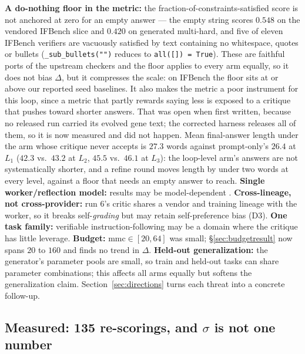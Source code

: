 \documentclass[11pt]{article}
\newcommand{\dd}{\ensuremath{\Delta}}
\begin{document}
\textbf{A do-nothing floor in the
metric:} the fraction-of-constraints-satisfied score is not anchored at zero for an empty
answer --- the empty string scores $0.548$ on the vendored IFBench slice and $0.420$ on
generated multi-hard, and five of eleven IFBench verifiers are vacuously satisfied by text
containing no whitespace, quotes or bullets (\texttt{\_sub\_bullets("")} reduces to
\texttt{all([]) = True}). These are faithful ports of the upstream checkers and the floor
applies to every arm equally, so it does not bias \dd, but it compresses the scale: on IFBench
the floor sits at or above our reported seed baselines. It also makes the metric a poor
instrument for this loop, since a metric that partly rewards saying less is exposed to a
critique that pushes toward shorter answers. That was open when first written, because no
released run carried its evolved gene text; the corrected harness releases all of them, so it
is now measured and did not happen. Mean final-answer length under the arm whose critique never
accepts is $27.3$ words against prompt-only's $26.4$ at $L_1$ ($42.3$ vs.\ $43.2$ at $L_2$,
$45.5$ vs.\ $46.1$ at $L_3$): the loop-level arm's answers are not systematically shorter, and
a refine round moves length by under two words at every level, against a floor that needs an
empty answer to reach. \textbf{Single worker/reflection
model:} results may be model-dependent \citep{huang2023cannot}. \textbf{Cross-lineage, not
cross-provider:} run 6's critic shares a vendor and training lineage with the worker, so it
breaks self-\emph{grading} but may retain self-preference bias (D3). \textbf{One task family:}
verifiable instruction-following may be a domain where the critique has little leverage.
\textbf{Budget:} $\mathrm{mmc}\in[20,64]$ was small; \S\ref{sec:budgetresult} now spans $20$
to $160$ and finds no trend in $\dd$. \textbf{Held-out generalization:} the
generator's parameter pools are small, so train and held-out tasks can share parameter
combinations; this affects all arms equally but softens the generalization claim.
Section~\ref{sec:directions} turns each threat into a concrete follow-up.

\subsection{Measured: 135 re-scorings, and \texorpdfstring{$\sigma$}{sigma} is not one number}
\label{sec:repeat}
\end{document}
